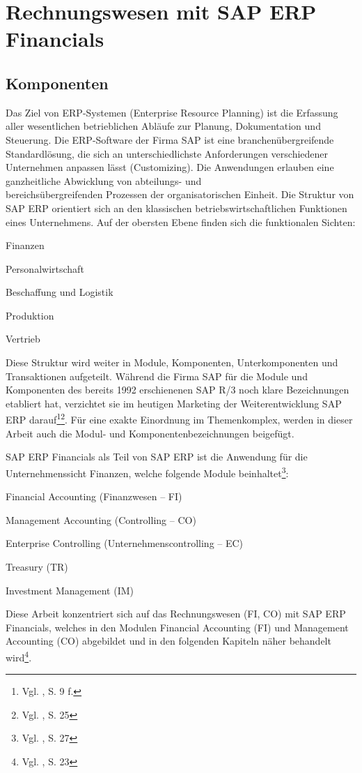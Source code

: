 \section{Rechnungswesen mit SAP ERP Financials}
\subsection{Komponenten}
\label{sec:Komponenten}
Das Ziel von ERP-Systemen (Enterprise Resource Planning) ist die Erfassung aller wesentlichen betrieblichen Abläufe zur Planung, Dokumentation und Steuerung. Die ERP-Software der Firma SAP ist eine branchenübergreifende Standardlösung, die sich an unterschiedlichste Anforderungen verschiedener Unternehmen anpassen lässt (Customizing). Die Anwendungen erlauben eine ganzheitliche Abwicklung von abteilungs- und\\bereichsübergreifenden Prozessen der organisatorischen Einheit. Die Struktur von SAP ERP orientiert sich an den klassischen betriebswirtschaftlichen Funktionen eines Unternehmens. Auf der obersten Ebene finden sich die funktionalen Sichten:
\begin{compactitem}
\item Finanzen
\item Personalwirtschaft
\item Beschaffung und Logistik
\item Produktion
\item Vertrieb
\end{compactitem}
Diese Struktur wird weiter in Module, Komponenten, Unterkomponenten und Transaktionen aufgeteilt. Während die Firma SAP für die Module und Komponenten des bereits 1992 erschienenen SAP R/3 noch klare Bezeichnungen etabliert hat, verzichtet sie im heutigen Marketing der Weiterentwicklung SAP ERP darauf\footnote{Vgl. \cite{Klein2010}, S. 9 f.}\footnote{Vgl. \cite{Hefner2001}, S. 25}. Für eine exakte Einordnung im Themenkomplex, werden in dieser Arbeit auch die Modul- und Komponentenbezeichnungen beigefügt.

SAP ERP Financials als Teil von SAP ERP ist die Anwendung für die Unternehmenssicht Finanzen, welche folgende Module beinhaltet\footnote{Vgl. \cite{Hefner2001}, S. 27}:
\begin{compactitem}
\item Financial Accounting (Finanzwesen -- FI)
\item Management Accounting (Controlling -- CO)
\item Enterprise Controlling (Unternehmenscontrolling -- EC)
\item Treasury (TR)
\item Investment Management (IM)
\end{compactitem}
Diese Arbeit konzentriert sich auf das Rechnungswesen (FI, CO) mit SAP ERP Financials, welches in den Modulen Financial Accounting (FI) und Management Accounting (CO) abgebildet und in den folgenden Kapiteln näher behandelt wird\footnote{Vgl. \cite{Patel2009}, S. 23}.

